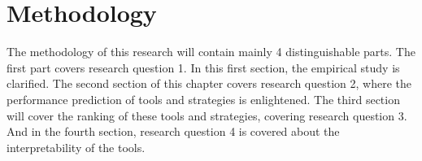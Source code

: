 \chapter{Methodology}
\label{chap:methodology}
The methodology of this research will contain mainly 4 distinguishable parts. The first part covers research question 1. In this first section, the empirical study is clarified. The second section of this chapter covers research question 2, where the performance prediction of tools and strategies is enlightened. The third section will cover the ranking of these tools and strategies, covering research question 3. And in the fourth section, research question 4 is covered about the interpretability of the tools.





